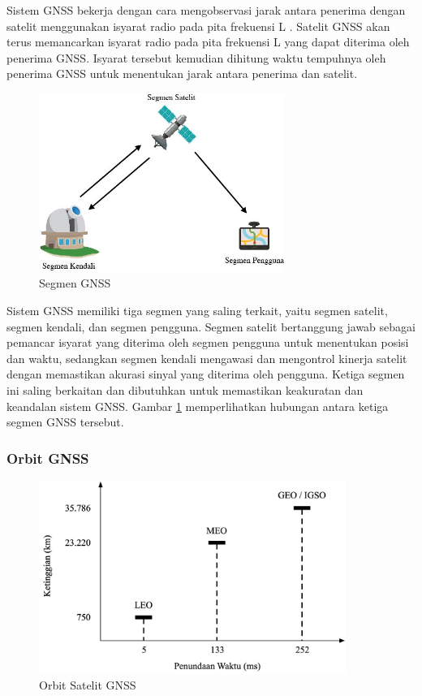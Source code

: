 Sistem GNSS bekerja dengan cara mengobservasi jarak antara penerima dengan satelit menggunakan isyarat radio pada pita frekuensi L \cite{TheEuropeanGlobalNavigationSatelliteSystemsAgency2021}. Satelit GNSS akan terus memancarkan isyarat radio pada pita frekuensi L yang dapat diterima oleh penerima GNSS. Isyarat tersebut kemudian dihitung waktu tempuhnya oleh penerima GNSS untuk menentukan jarak antara penerima dan satelit. 

\begin{figure}[H]
	\centering
	\includegraphics[width=8cm]{contents/chapter-2/gnss_segment.jpg}
	\caption{Segmen GNSS}
	\label{Fig: gnss_segment}
\end{figure}

Sistem GNSS memiliki tiga segmen yang saling terkait, yaitu segmen satelit, segmen kendali, dan segmen pengguna. Segmen satelit bertanggung jawab sebagai pemancar isyarat yang diterima oleh segmen pengguna untuk menentukan posisi dan waktu, sedangkan segmen kendali mengawasi dan mengontrol kinerja satelit dengan memastikan akurasi sinyal yang diterima oleh pengguna. Ketiga segmen ini saling berkaitan dan dibutuhkan untuk memastikan keakuratan dan keandalan sistem GNSS. Gambar \ref{Fig: gnss_segment} memperlihatkan hubungan antara ketiga segmen GNSS tersebut.

\subsubsection{Orbit GNSS}
\begin{figure}[H]
	\centering
	\includegraphics[width=10cm]{contents/chapter-2/alt-comp.png}
	\caption{Orbit Satelit GNSS}
	\label{Fig: alt-comp}
\end{figure}

